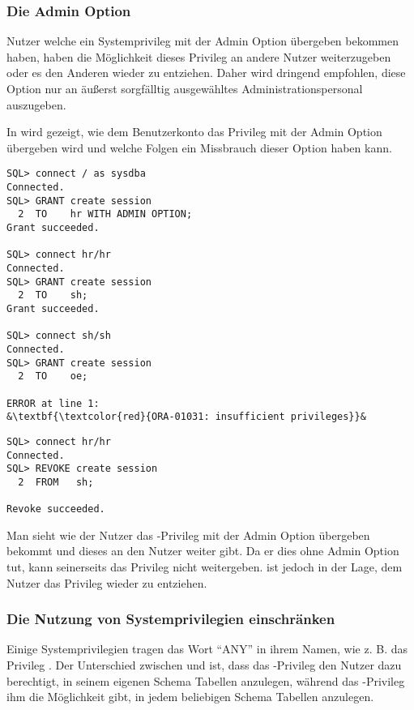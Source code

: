         \subsubsection{Die Admin Option}
          \begin{merke}
            Nutzer welche ein Systemprivileg mit der Admin Option übergeben
            bekommen haben, haben die Möglichkeit dieses Privileg an andere
            Nutzer weiterzugeben oder es den Anderen wieder zu entziehen. Daher
            wird dringend empfohlen, diese Option nur an äußerst sorgfälltig
            ausgewähltes Administrationspersonal auszugeben.
          \end{merke}
          In  wird gezeigt, wie dem Benutzerkonto
           das  Privileg mit der Admin
          Option übergeben wird und welche Folgen ein Missbrauch dieser Option
          haben kann.
          \begin{lstlisting}[caption={Zuweisen eines System Privileges mit ADMIN
          OPTION},label=admin230,language=oracle_sql,alsolanguage=sqlplus]
SQL> connect / as sysdba
Connected.
SQL> GRANT create session
  2  TO    hr WITH ADMIN OPTION;
Grant succeeded.

SQL> connect hr/hr
Connected.
SQL> GRANT create session
  2  TO    sh;
Grant succeeded.

SQL> connect sh/sh
Connected.
SQL> GRANT create session
  2  TO    oe;

ERROR at line 1:
&\textbf{\textcolor{red}{ORA-01031: insufficient privileges}}&
\end{lstlisting}
\begin{lstlisting}[caption={Zuweisen eines System Privileges mit ADMIN
          OPTION},label=admin230,language=oracle_sql,alsolanguage=sqlplus]
SQL> connect hr/hr
Connected.
SQL> REVOKE create session
  2  FROM   sh;

Revoke succeeded.
          \end{lstlisting}
          Man sieht wie der Nutzer  das -Privileg mit der Admin Option übergeben bekommt und dieses
          an den Nutzer  weiter gibt. Da er dies ohne Admin
          Option tut, kann  seinerseits das Privileg nicht
          weitergeben.  ist jedoch in der Lage, dem Nutzer
           das Privileg wieder zu entziehen.
        \subsubsection{Die Nutzung von Systemprivilegien einschränken}
          Einige Systemprivilegien tragen das Wort \enquote{ANY} in ihrem Namen,
          wie z. B. das Privileg . Der Unterschied
          zwischen  und  ist,
          dass das -Privileg den Nutzer dazu berechtigt,
          in seinem eigenen Schema Tabellen anzulegen, während das
          -Privileg ihm die Möglichkeit gibt, in
          jedem beliebigen Schema Tabellen anzulegen.

